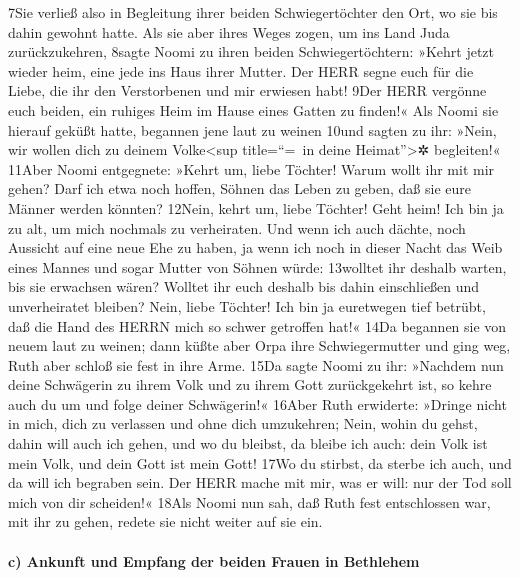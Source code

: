 7Sie verließ also in Begleitung ihrer beiden Schwiegertöchter den Ort,
wo sie bis dahin gewohnt hatte. Als sie aber ihres Weges zogen, um ins
Land Juda zurückzukehren, 8sagte Noomi zu ihren beiden
Schwiegertöchtern: »Kehrt jetzt wieder heim, eine jede ins Haus ihrer
Mutter. Der HERR segne euch für die Liebe, die ihr den Verstorbenen und
mir erwiesen habt! 9Der HERR vergönne euch beiden, ein ruhiges Heim im
Hause eines Gatten zu finden!« Als Noomi sie hierauf geküßt hatte,
begannen jene laut zu weinen 10und sagten zu ihr: »Nein, wir wollen dich
zu deinem Volke\textless sup title=``=~in deine Heimat''\textgreater✲
begleiten!« 11Aber Noomi entgegnete: »Kehrt um, liebe Töchter! Warum
wollt ihr mit mir gehen? Darf ich etwa noch hoffen, Söhnen das Leben zu
geben, daß sie eure Männer werden könnten? 12Nein, kehrt um, liebe
Töchter! Geht heim! Ich bin ja zu alt, um mich nochmals zu verheiraten.
Und wenn ich auch dächte, noch Aussicht auf eine neue Ehe zu haben, ja
wenn ich noch in dieser Nacht das Weib eines Mannes und sogar Mutter von
Söhnen würde: 13wolltet ihr deshalb warten, bis sie erwachsen wären?
Wolltet ihr euch deshalb bis dahin einschließen und unverheiratet
bleiben? Nein, liebe Töchter! Ich bin ja euretwegen tief betrübt, daß
die Hand des HERRN mich so schwer getroffen hat!« 14Da begannen sie von
neuem laut zu weinen; dann küßte aber Orpa ihre Schwiegermutter und ging
weg, Ruth aber schloß sie fest in ihre Arme. 15Da sagte Noomi zu ihr:
»Nachdem nun deine Schwägerin zu ihrem Volk und zu ihrem Gott
zurückgekehrt ist, so kehre auch du um und folge deiner Schwägerin!«
16Aber Ruth erwiderte: »Dringe nicht in mich, dich zu verlassen und ohne
dich umzukehren; Nein, wohin du gehst, dahin will auch ich gehen, und wo
du bleibst, da bleibe ich auch: dein Volk ist mein Volk, und dein Gott
ist mein Gott! 17Wo du stirbst, da sterbe ich auch, und da will ich
begraben sein. Der HERR mache mit mir, was er will: nur der Tod soll
mich von dir scheiden!« 18Als Noomi nun sah, daß Ruth fest entschlossen
war, mit ihr zu gehen, redete sie nicht weiter auf sie ein.

\hypertarget{c-ankunft-und-empfang-der-beiden-frauen-in-bethlehem}{%
\paragraph{c) Ankunft und Empfang der beiden Frauen in
Bethlehem}\label{c-ankunft-und-empfang-der-beiden-frauen-in-bethlehem}}


